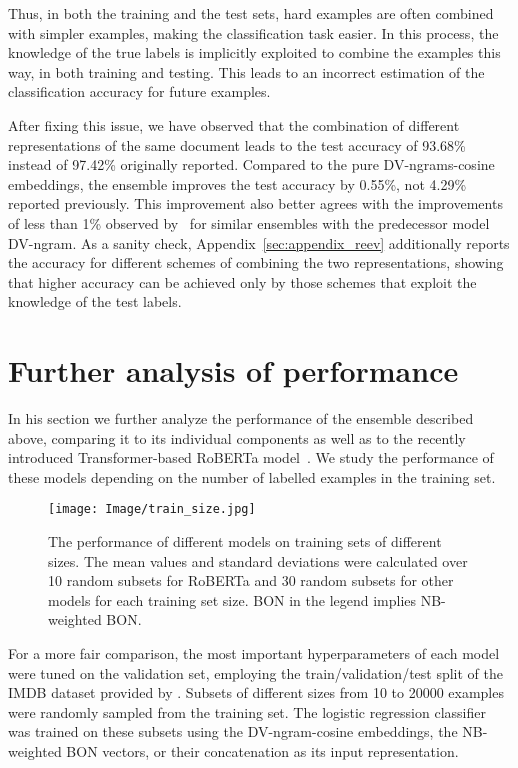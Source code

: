 \documentclass[11pt]{article}
\begin{document}
Thus, in both the training and the test sets, hard examples are often combined with simpler examples, making the classification task easier. In this process, the knowledge of the true labels is implicitly exploited to combine the examples this way, in both training and testing. This leads to an incorrect estimation of the classification accuracy for future examples.

After fixing this issue, we have observed that the combination of different representations of the same document leads to the test accuracy of 93.68\% instead of 97.42\% originally reported. Compared to the pure DV-ngrams-cosine embeddings, the ensemble improves the test accuracy by 0.55\%, not 4.29\% reported previously. This improvement also better agrees with the improvements of less than 1\% observed by~\citet{li_2016} for similar ensembles with the predecessor model DV-ngram. As a sanity check, Appendix~\ref{sec:appendix_reev} additionally reports the accuracy for different schemes of combining the two representations, showing that higher accuracy can be achieved only by those schemes that exploit the knowledge of the test labels.\newline


\section{Further analysis of performance}
\label{sec:train_size}
In his section we further analyze the performance of the ensemble described above, comparing it to its individual components as well as to the recently introduced Transformer-based RoBERTa model~\cite{liu2020roberta}. We study the performance of these models depending on the number of labelled examples in the training set.
\begin{figure}[ht] \centering \texttt{[image: Image/train\_size.jpg]} 
    \caption{The performance of different models on training sets of different sizes. The mean values and standard deviations were calculated over 10 random subsets for RoBERTa and 30 random subsets for other models for each training set size. BON in the legend implies NB-weighted BON.}
    \label{fig:train_size}
\end{figure}

For a more fair comparison, the most important hyperparameters of each model were tuned on the validation set, employing the train/validation/test split of the IMDB dataset provided by \citep{suchin2020}. Subsets of different sizes from 10 to 20000 examples were randomly sampled from the training set. The logistic regression classifier was trained on these subsets using the DV-ngram-cosine embeddings, the NB-weighted BON vectors, or their concatenation as its input representation. 
\end{document}
